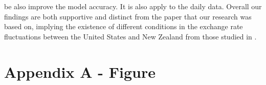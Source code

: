\documentclass[10pt]{article}
\begin{document}
be also improve the model accuracy. It is also apply to the daily data. Overall our findings are both supportive and distinct from the paper that our research was based on, implying the existence of different conditions in the exchange rate fluctuations between the United States and New Zealand from those studied in \cite{lloyd2020exchange}.










\printbibliography

\newpage

\appendix

\section{Appendix A - Figure}
\begin{lstlisting}[language=R]

\end{lstlisting}
\end{document}
